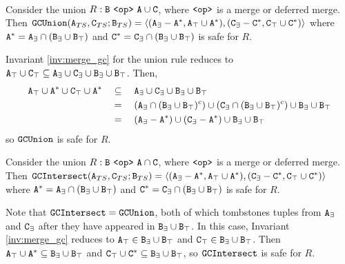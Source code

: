 ~


\begin{example}[Union GC]
\label{ex:union_gc}
Consider the union $R: \tt{B} ~\tt{<op>}~ \tt{A} \cup \tt{C}$, where $\tt{<op>}$ is a merge or deferred merge.
Then $\tt{GCUnion}(\tt{A}_{TS}, \tt{C}_{TS}; \tt{B}_{TS}) = \langle (\tt{A}_\exists - \tt{A}^*, \tt{A}_\top \cup \tt{A}^*), (\tt{C}_\exists - \tt{C}^*, \tt{C}_\top \cup \tt{C}^*) \rangle$ where $\tt{A}^* = \tt{A}_\exists \cap  (\tt{B}_\exists \cup \tt{B}_\top)$ and $\tt{C}^* = \tt{C}_\exists \cap  (\tt{B}_\exists \cup \tt{B}_\top)$ is safe for $R$.
\end{example}
Invariant \ref{inv:merge_gc} for the union rule reduces to $\tt{A}_\top \cup \tt{C}_\top \subseteq \tt{A}_\exists \cup \tt{C}_\exists \cup \tt{B}_\exists \cup \tt{B}_\top$.
Then,
\begin{align*}
\tt{A}_\top \cup \tt{A}^* \cup \tt{C}_\top \cup \tt{A}^*
&\quad\subseteq\quad \tt{A}_\exists \cup \tt{C}_\exists \cup \tt{B}_\exists \cup \tt{B}_\top\\
&\quad=\quad (\tt{A}_\exists \cap (\tt{B}_\exists \cup \tt{B}_\top)^c) \cup (\tt{C}_\exists \cap (\tt{B}_\exists \cup \tt{B}_\top)^c) \cup \tt{B}_\exists \cup \tt{B}_\top\\
&\quad=\quad (\tt{A}_\exists - \tt{A}^*) \cup (\tt{C}_\exists - \tt{A}^*) \cup \tt{B}_\exists \cup \tt{B}_\top\\
\end{align*}
so $\tt{GCUnion}$ is safe for $R$.

\begin{example}[Intersection GC]
\label{ex:intersection_gc}
Consider the union $R: \tt{B} ~\tt{<op>}~ \tt{A} \cap \tt{C}$, where $\tt{<op>}$ is a merge or deferred merge.
Then $\tt{GCIntersect}(\tt{A}_{TS}, \tt{C}_{TS}; \tt{B}_{TS}) = \langle (\tt{A}_\exists - \tt{A}^*, \tt{A}_\top \cup \tt{A}^*), (\tt{C}_\exists - \tt{C}^*, \tt{C}_\top \cup \tt{C}^*) \rangle$ where $\tt{A}^* = \tt{A}_\exists \cap  (\tt{B}_\exists \cup \tt{B}_\top)$ and $\tt{C}^* = \tt{C}_\exists \cap  (\tt{B}_\exists \cup \tt{B}_\top)$ is safe for $R$.
\end{example}
Note that $\tt{GCIntersect} = \tt{GCUnion}$, both of which tombstones tuples from $\tt{A}_\exists$ and $\tt{C}_\exists$ after they have appeared in $\tt{B}_\exists \cup \tt{B}_\top$.
In this case, Invariant \ref{inv:merge_gc} reduces to $\tt{A}_\top \in \tt{B}_\exists \cup \tt{B}_\top$ and $\tt{C}_\top \in \tt{B}_\exists \cup \tt{B}_\top$.
Then $\tt{A}_\top \cup \tt{A}^* \subseteq \tt{B}_\exists \cup \tt{B}_\top$ and $\tt{C}_\top \cup \tt{C}^* \subseteq \tt{B}_\exists \cup \tt{B}_\top$, so $\tt{GCIntersect}$ is safe for $R$.

